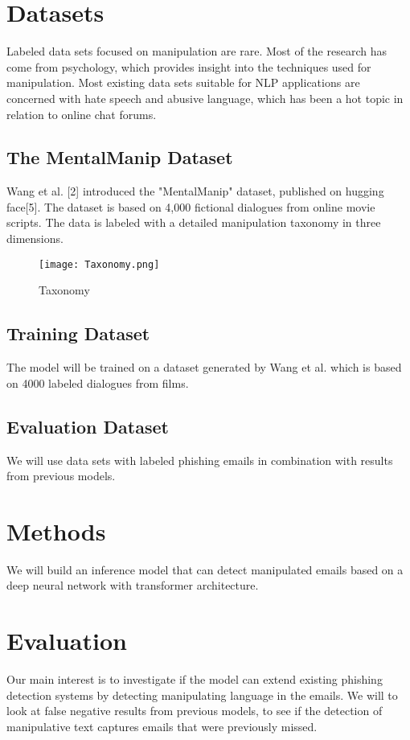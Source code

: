 \documentclass[
	letterpaper, %
	12pt, %
	unnumberedsections, %
	twoside, %
]{LTJournalArticle}
\begin{document}
\section{Datasets}
Labeled data sets focused on manipulation are rare. Most of the research has come from psychology, which provides insight into the techniques used for manipulation. Most existing data sets suitable for NLP applications are concerned with hate speech and abusive language, which has been a hot topic in relation to online chat forums.

\subsection{The MentalManip Dataset}
Wang et al. [2] introduced the "MentalManip" dataset, published on hugging face[5]. The dataset is based on 4,000 fictional dialogues from online movie scripts. The data is labeled with a detailed manipulation taxonomy in three dimensions.

\begin{figure}[!htp] %
	\centering
	\texttt{[image: Taxonomy.png]}
	\caption{Taxonomy}
	\label{fig:Taxonomy}
\end{figure}




\subsection{Training Dataset}
The model will be trained on a dataset generated by Wang et al. \cite{MentalManip} which is based on 4000 labeled dialogues from films.\\

\subsection{Evaluation Dataset}
We will use data sets with labeled phishing emails in combination with results from previous models.

\section{Methods}
We will build an inference model that can detect manipulated emails based on a deep neural network with transformer architecture.

\section{Evaluation}
Our main interest is to investigate if the model can extend existing phishing detection systems by detecting manipulating language in the emails. We will to look at false negative results from previous models, to see if the detection of manipulative text captures emails that were previously missed.
\end{document}
